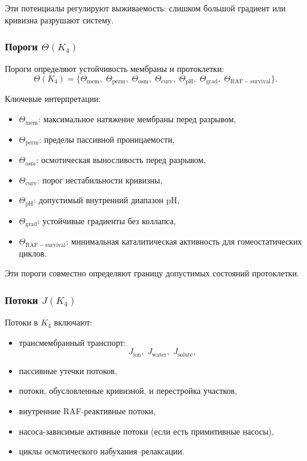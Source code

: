 Эти потенциалы регулируют выживаемость: слишком большой градиент или
кривизна разрушают систему.

\subsubsection{Пороги \texorpdfstring{$\Theta(K_4)$}{\Theta(K_4)}}

Пороги определяют устойчивость мембраны и протоклетки:
\[
\Theta(K_4) =
\{\Theta_{\mathrm{mem}},\;
  \Theta_{\mathrm{perm}},\;
  \Theta_{\mathrm{osm}},\;
  \Theta_{\mathrm{curv}},\;
  \Theta_{\mathrm{pH}},\;
  \Theta_{\mathrm{grad}},\;
  \Theta_{\mathrm{RAF-survival}}\}.
\]

Ключевые интерпретации:
\begin{itemize}
    \item $\Theta_{\mathrm{mem}}$: максимальное натяжение мембраны перед
          разрывом,
    \item $\Theta_{\mathrm{perm}}$: пределы пассивной проницаемости,
    \item $\Theta_{\mathrm{osm}}$: осмотическая выносливость перед разрывом,
    \item $\Theta_{\mathrm{curv}}$: порог нестабильности кривизны,
    \item $\Theta_{\mathrm{pH}}$: допустимый внутренний диапазон pH,
    \item $\Theta_{\mathrm{grad}}$: устойчивые градиенты без коллапса,
    \item $\Theta_{\mathrm{RAF-survival}}$: минимальная каталитическая активность
          для гомеостатических циклов.
\end{itemize}

Эти пороги совместно определяют границу допустимых состояний протоклетки.

\subsubsection{Потоки \texorpdfstring{$J(K_4)$}{J(K_4)}}

Потоки в $K_4$ включают:
\begin{itemize}
    \item трансмембранный транспорт:
          \[
          J_{\mathrm{ion}},\; J_{\mathrm{water}},\; J_{\mathrm{solute}},
          \]
    \item пассивные утечки потоков,
    \item потоки, обусловленные кривизной, и перестройка участков,
    \item внутренние RAF-реактивные потоки,
    \item насоса-зависимые активные потоки (если есть примитивные насосы),
    \item циклы осмотического набухания–релаксации.
\end{itemize}

